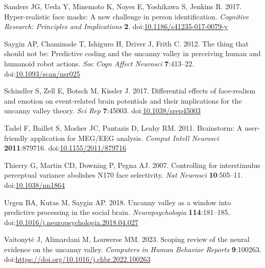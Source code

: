 \documentclass[
]{article}
\newlength{\cslhangindent}
\newlength{\cslentryspacingunit} %
\newenvironment{CSLReferences}[2] %
 {%
  \setlength{\parindent}{0pt}
  \ifodd #1
  \let\oldpar\par
  \def\par{\hangindent=\cslhangindent\oldpar}
  \fi
  \setlength{\parskip}{#2\cslentryspacingunit}
 }%
 {}
\begin{document}
\begin{CSLReferences}{1}{0}
\leavevmode{}%
Sanders JG, Ueda Y, Minemoto K, Noyes E, Yoshikawa S, Jenkins R. 2017. Hyper-realistic face masks: A new challenge in person identification. \emph{Cognitive Research: Principles and Implications} \textbf{2}. doi:\href{https://doi.org/10.1186/s41235-017-0079-y}{10.1186/s41235-017-0079-y}

\leavevmode{}%
Saygin AP, Chaminade T, Ishiguro H, Driver J, Frith C. 2012. The thing that should not be: Predictive coding and the uncanny valley in perceiving human and humanoid robot actions. \emph{Soc Cogn Affect Neurosci} \textbf{7}:413--22. doi:\href{https://doi.org/10.1093/scan/nsr025}{10.1093/scan/nsr025}

\leavevmode{}%
Schindler S, Zell E, Botsch M, Kissler J. 2017. Differential effects of face-realism and emotion on event-related brain potentials and their implications for the uncanny valley theory. \emph{Sci Rep} \textbf{7}:45003. doi:\href{https://doi.org/10.1038/srep45003}{10.1038/srep45003}

\leavevmode{}%
Tadel F, Baillet S, Mosher JC, Pantazis D, Leahy RM. 2011. Brainstorm: A user-friendly application for MEG/EEG analysis. \emph{Comput Intell Neurosci} \textbf{2011}:879716. doi:\href{https://doi.org/10.1155/2011/879716}{10.1155/2011/879716}

\leavevmode{}%
Thierry G, Martin CD, Downing P, Pegna AJ. 2007. Controlling for interstimulus perceptual variance abolishes N170 face selectivity. \emph{Nat Neurosci} \textbf{10}:505--11. doi:\href{https://doi.org/10.1038/nn1864}{10.1038/nn1864}

\leavevmode{}%
Urgen BA, Kutas M, Saygin AP. 2018. Uncanny valley as a window into predictive processing in the social brain. \emph{Neuropsychologia} \textbf{114}:181--185. doi:\href{https://doi.org/10.1016/j.neuropsychologia.2018.04.027}{10.1016/j.neuropsychologia.2018.04.027}

\leavevmode{}%
Vaitonytė J, Alimardani M, Louwerse MM. 2023. Scoping review of the neural evidence on the uncanny valley. \emph{Computers in Human Behavior Reports} \textbf{9}:100263. doi:\url{https://doi.org/10.1016/j.chbr.2022.100263}

\end{CSLReferences}
\end{document}
